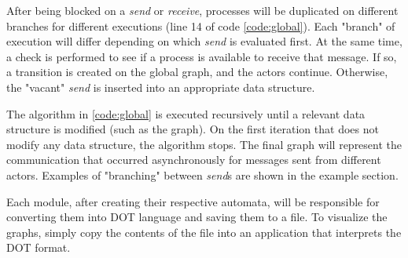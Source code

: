 After being blocked on a \textit{send} or \textit{receive}, processes will be duplicated on different branches for different executions (line 14 of code \ref{code:global}). Each "branch" of execution will differ depending on which \textit{send} is evaluated first. At the same time, a check is performed to see if a process is available to receive that message. If so, a transition is created on the global graph, and the actors continue. Otherwise, the "vacant" \textit{send} is inserted into an appropriate data structure.

The algorithm in \ref{code:global} is executed recursively until a relevant data structure is modified (such as the graph). On the first iteration that does not modify any data structure, the algorithm stops. The final graph will represent the communication that occurred asynchronously for messages sent from different actors. Examples of "branching" between \textit{send}s are shown in the example section.

Each module, after creating their respective automata, will be responsible for converting them into DOT language and saving them to a file. To visualize the graphs, simply copy the contents of the file into an application that interprets the DOT format.
